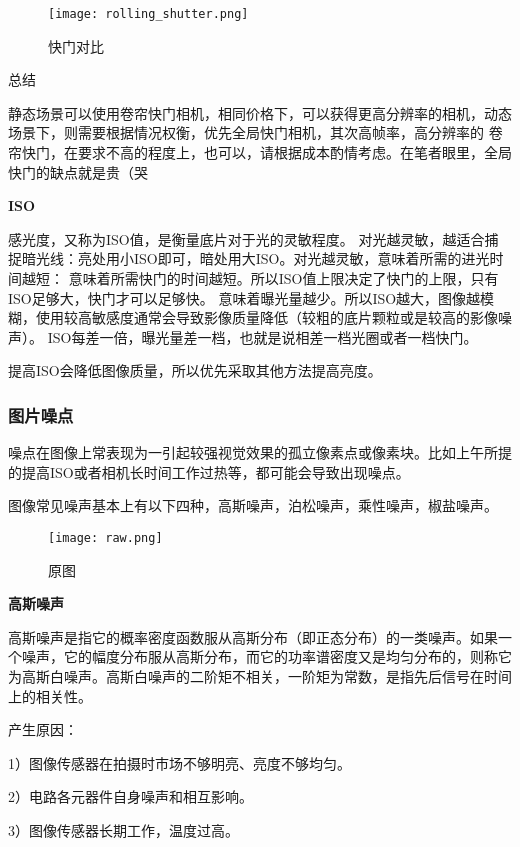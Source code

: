 \begin{figure}[H]
    \centering
    \texttt{[image: rolling\_shutter.png]}
    \caption{快门对比} %
    \label{fig:果冻} %
\end{figure}

总结

静态场景可以使用卷帘快门相机，相同价格下，可以获得更高分辨率的相机，动态场景下，则需要根据情况权衡，优先全局快门相机，其次高帧率，高分辨率的
卷帘快门，在要求不高的程度上，也可以，请根据成本酌情考虑。在笔者眼里，全局快门的缺点就是贵（哭

\textbf{ISO}

感光度，又称为ISO值，是衡量底片对于光的灵敏程度。
对光越灵敏，越适合捕捉暗光线：亮处用小ISO即可，暗处用大ISO。对光越灵敏，意味着所需的进光时间越短：
意味着所需快门的时间越短。所以ISO值上限决定了快门的上限，只有ISO足够大，快门才可以足够快。
意味着曝光量越少。所以ISO越大，图像越模糊，使用较高敏感度通常会导致影像质量降低（较粗的底片颗粒或是较高的影像噪声）。
ISO每差一倍，曝光量差一档，也就是说相差一档光圈或者一档快门。

提高ISO会降低图像质量，所以优先采取其他方法提高亮度。

\subsubsection{图片噪点}
噪点在图像上常表现为一引起较强视觉效果的孤立像素点或像素块。比如上午所提的提高ISO或者相机长时间工作过热等，都可能会导致出现噪点。

图像常见噪声基本上有以下四种，高斯噪声，泊松噪声，乘性噪声，椒盐噪声。

\begin{figure}[H]
    \centering
    \texttt{[image: raw.png]}
    \caption{原图} %
    \label{fig:原图} %
\end{figure}

\textbf{高斯噪声}

高斯噪声是指它的概率密度函数服从高斯分布（即正态分布）的一类噪声。如果一个噪声，它的幅度分布服从高斯分布，而它的功率谱密度又是均匀分布的，则称它为高斯白噪声。高斯白噪声的二阶矩不相关，一阶矩为常数，是指先后信号在时间上的相关性。

产生原因：

1）图像传感器在拍摄时市场不够明亮、亮度不够均匀。

2）电路各元器件自身噪声和相互影响。

3）图像传感器长期工作，温度过高。

